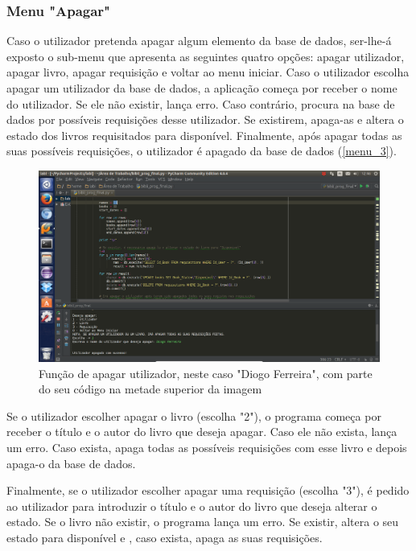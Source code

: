 \documentclass[11pt,openany,twoside]{report}
\begin{document}
\subsubsection{Menu "Apagar"}

Caso o utilizador pretenda apagar algum elemento da base de dados, ser-lhe-á exposto o sub-menu que apresenta as seguintes quatro opções: apagar utilizador, apagar livro, apagar requisição e voltar ao menu iniciar. Caso o utilizador escolha apagar um utilizador da base de dados, a aplicação começa por receber o nome do utilizador. Se ele não existir, lança erro. Caso contrário, procura na base de dados por possíveis requisições desse utilizador. Se existirem, apaga-as e altera o estado dos livros requisitados para disponível. Finalmente, após apagar todas as suas possíveis requisições, o utilizador é apagado da base de dados (\autoref{menu_3}).

\begin{figure}
 \center
 \includegraphics[scale=.35]{menu_3.png}
 \caption{Função de apagar utilizador, neste caso "Diogo Ferreira", com parte do seu código na metade superior da imagem}
 \label{menu_3}
\end{figure}

Se o utilizador escolher apagar o livro (escolha "2"), o programa começa por receber o título e o autor do livro que deseja apagar. Caso ele não exista, lança um erro. Caso exista, apaga todas as possíveis requisições com esse livro e depois apaga-o da base de dados.

Finalmente, se o utilizador escolher apagar uma requisição (escolha "3"), é pedido ao utilizador para introduzir o título e o autor do livro que deseja alterar o estado. Se o livro não existir, o programa lança um erro. Se existir, altera o seu estado para disponível e , caso exista, apaga as suas requisições.
\end{document}
